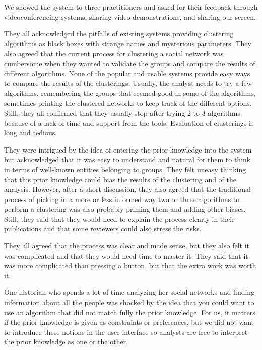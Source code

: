 We showed the system to three practitioners and asked for their feedback through videoconferencing systems, sharing video demonstrations, and sharing our screen.

They all acknowledged the pitfalls of existing systems providing clustering algorithms as black boxes with strange names and mysterious parameters.
They also agreed that the current process for clustering a social network was cumbersome when they wanted to validate the groups and compare the results of different algorithms. None of the popular and usable systems provide easy ways to compare the results of the clusterings. Usually, the analyst needs to try a few algorithms, remembering the groups that seemed good in some of the algorithms, sometimes printing the clustered networks to keep track of the different options. Still, they all confirmed that they usually stop after trying 2 to 3 algorithms because of a lack of time and support from the tools. Evaluation of clusterings is long and tedious.

They were intrigued by the idea of entering the prior knowledge into the system but acknowledged that it was easy to understand and natural for them to think in terms of well-known entities belonging to groups. They felt uneasy thinking that this prior knowledge could bias the results of the clustering and of the analysis. However, after a short discussion, they also agreed that the traditional process of picking in a more or less informed way two or three algorithms to perform a clustering was also probably priming them and adding other biases. Still, they said that they would need to explain the process clearly in their publications and that some reviewers could also stress the risks.

They all agreed that the process was clear and made sense, but they also felt it was complicated and that they would need time to master it. They said that it was more complicated than pressing a button, but that the extra work was worth it.

One historian who spends a lot of time analyzing her social networks and finding information about all the people was shocked by the idea that you could want to use an algorithm that did not match fully the prior knowledge. For us, it matters if the prior knowledge is given as constraints or preferences, but we did not want to introduce these notions in the user interface so analysts are free to interpret the prior knowledge as one or the other.

